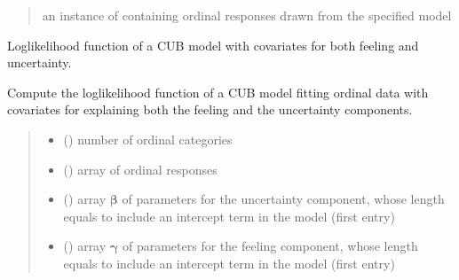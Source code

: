 \documentclass[letterpaper,10pt,english]{sphinxmanual}
\begin{document}
\begin{fulllineitems}
\begin{quote}
\begin{description}
\begin{itemize}
\end{itemize}

\sphinxAtStartPar
an instance of  containing ordinal responses drawn from the specified model

\end{description}\end{quote}

\end{fulllineitems}


\begin{fulllineitems}
\label{\detokenize{cubmods:cubmods.cub_yw.loglik}}
\pysigstartsignatures
{}
\pysigstopsignatures
\sphinxAtStartPar
Log\sphinxhyphen{}likelihood function of a CUB model with covariates for both feeling and uncertainty.

\sphinxAtStartPar
Compute the log\sphinxhyphen{}likelihood function of a CUB model fitting ordinal data
with covariates for explaining both the feeling and the uncertainty components.
\begin{quote}\begin{description}
\begin{itemize}
\item {} 
\sphinxAtStartPar
{} () \textendash{} number of ordinal categories

\item {} 
\sphinxAtStartPar
{} () \textendash{} array of ordinal responses

\item {} 
\sphinxAtStartPar
{} () \textendash{} array \(\pmb \beta\) of parameters for the uncertainty component, whose length equals 
 to include an intercept term in the model (first entry)

\item {} 
\sphinxAtStartPar
{} () \textendash{} array \(\pmb \gamma\) of parameters for the feeling component, whose length equals 
 to include an intercept term in the model (first entry)


\end{itemize}
\end{description}
\end{quote}
\end{fulllineitems}
\end{document}
